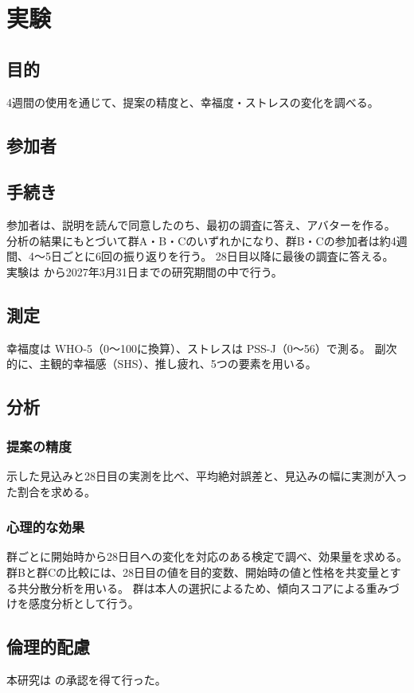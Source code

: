 \chapter{実験}
\section{目的}
4週間の使用を通じて、提案の精度と、幸福度・ストレスの変化を調べる。

\section{参加者}

\section{手続き}
参加者は、説明を読んで同意したのち、最初の調査に答え、アバターを作る。
分析の結果にもとづいて群A・B・Cのいずれかになり、群B・Cの参加者は約4週間、4〜5日ごとに6回の振り返りを行う。
28日目以降に最後の調査に答える。
実験は  から2027年3月31日までの研究期間の中で行う。

\section{測定}
幸福度は WHO-5（0〜100に換算）、ストレスは PSS-J（0〜56）で測る。
副次的に、主観的幸福感（SHS）、推し疲れ、5つの要素を用いる。

\section{分析}
\subsection{提案の精度}
示した見込みと28日目の実測を比べ、平均絶対誤差と、見込みの幅に実測が入った割合を求める。
\subsection{心理的な効果}
群ごとに開始時から28日目への変化を対応のある検定で調べ、効果量を求める。
群Bと群Cの比較には、28日目の値を目的変数、開始時の値と性格を共変量とする共分散分析を用いる。
群は本人の選択によるため、傾向スコアによる重みづけを感度分析として行う。

\section{倫理的配慮}
本研究は  の承認を得て行った。
